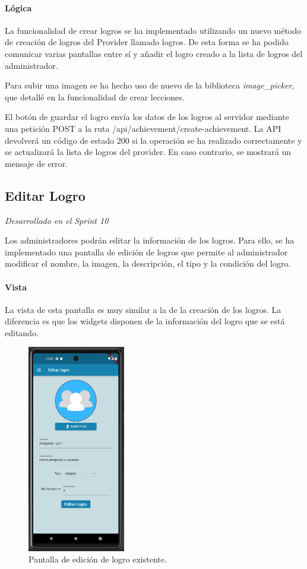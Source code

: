\paragraph*{Lógica}
La funcionalidad de crear logros se ha implementado utilizando un nuevo método de creación de logros del Provider llamado logros. De esta forma
se ha podido comunicar varias pantallas entre sí y añadir el logro creado a la lista de logros del administrador.


Para subir una imagen se ha hecho uso de nuevo de la biblioteca \textit{image\_picker}, que detallé en la funcionalidad de crear lecciones.

El botón de guardar el logro envía los datos de los logros al servidor mediante una petición POST a la ruta /api/achievement/create-achievement. La API devolverá un código de estado 200 si la operación se ha realizado correctamente y se actualizará la lista de logros del provider. En caso contrario, se mostrará un mensaje de error.


\subsection{Editar Logro} 

\textit{Desarrollado en el Sprint 10}

Los administradores podrán editar la información de los logros. Para ello, se ha implementado una pantalla de edición de logros que permite al administrador modificar el nombre, la imagen, la descripción, el tipo y la condición del logro.

\paragraph*{Vista}
La vista de esta pantalla es muy similar a la de la creación de los logros. La diferencia es que los widgets disponen de la información del logro que se está editando.

\begin{figure}[H]
  \centering
  \includegraphics[width=0.38\textwidth]{imagenes/c7/editarlogro.png}
  \caption{Pantalla de edición de logro existente.} 
  \label{fig:edicion_logro}
\end{figure}


